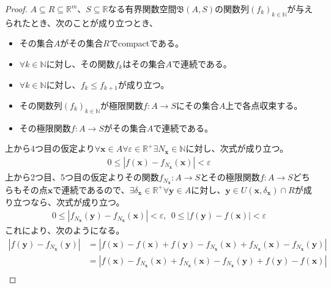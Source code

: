 \documentclass[dvipdfmx]{jsarticle}
\begin{document}
\begin{proof}
$A \subseteq R \subseteq \mathbb{R}^{m}$、$S \subseteq \mathbb{R}$なる有界関数空間$\mathfrak{B}(A,S)$の関数列$\left( f_{k} \right)_{k \in \mathbb{N}}$が与えられたとき、次のことが成り立つとき、
\begin{itemize}
\item
  その集合$A$がその集合$R$でcompactである。
\item
  $\forall k \in \mathbb{N}$に対し、その関数$f_{k}$はその集合$A$で連続である。
\item
  $\forall k \in \mathbb{N}$に対し、$f_{k} \leq f_{k + 1}$が成り立つ。
\item
  その関数列$\left( f_{k} \right)_{k \in \mathbb{N}}$が極限関数$f:A \rightarrow S$にその集合$A$上で各点収束する。
\item
  その極限関数$f:A \rightarrow S$がその集合$A$で連続である。
\end{itemize}
上から4つ目の仮定より$\forall\mathbf{x} \in A\forall\varepsilon \in \mathbb{R}^{+}\exists N_{\mathbf{x}} \in \mathbb{N}$に対し、次式が成り立つ。
\begin{align*}
0 \leq \left| f\left( \mathbf{x} \right) - f_{N_{\mathbf{x}}}\left( \mathbf{x} \right) \right| < \varepsilon
\end{align*}
上から2つ目、5つ目の仮定よりその関数$f_{N_{\mathbf{x}}}:A \rightarrow S$とその極限関数$f:A \rightarrow S$どちらもその点$\mathbf{x}$で連続であるので、$\exists\delta_{\mathbf{x}} \in \mathbb{R}^{+}\forall\mathbf{y} \in A$に対し、$\mathbf{y} \in U\left( \mathbf{x},\delta_{\mathbf{x}} \right) \cap R$が成り立つなら、次式が成り立つ。
\begin{align*}
0 \leq \left| f_{N_{\mathbf{x}}}\left( \mathbf{y} \right) - f_{N_{\mathbf{x}}}\left( \mathbf{x} \right) \right| < \varepsilon,\ \ 0 \leq \left| f\left( \mathbf{y} \right) - f\left( \mathbf{x} \right) \right| < \varepsilon
\end{align*}
これにより、次のようになる。
\begin{align*}
\left| f\left( \mathbf{y} \right) - f_{N_{\mathbf{x}}}\left( \mathbf{y} \right) \right| &= \left| f\left( \mathbf{x} \right) - f\left( \mathbf{x} \right) + f\left( \mathbf{y} \right) - f_{N_{\mathbf{x}}}\left( \mathbf{x} \right) + f_{N_{\mathbf{x}}}\left( \mathbf{x} \right) - f_{N_{\mathbf{x}}}\left( \mathbf{y} \right) \right|\\
&= \left| f\left( \mathbf{x} \right) - f_{N_{\mathbf{x}}}\left( \mathbf{x} \right) + f_{N_{\mathbf{x}}}\left( \mathbf{x} \right) - f_{N_{\mathbf{x}}}\left( \mathbf{y} \right) + f\left( \mathbf{y} \right) - f\left( \mathbf{x} \right) \right|\\

\end{align*}
\end{proof}
\end{document}
